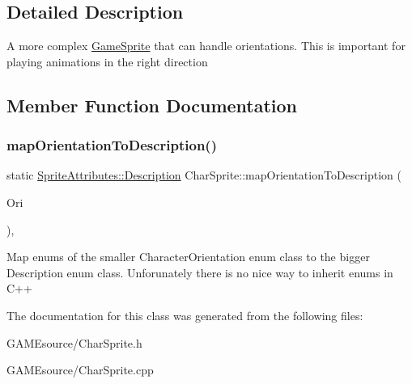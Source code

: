 \subsection{Detailed Description}
A more complex \mbox{\hyperlink{class_game_sprite}{Game\+Sprite}} that can handle orientations. This is important for playing animations in the right direction 

\subsection{Member Function Documentation}
\mbox{\label{class_char_sprite_a7556b4b4123dbd51b13ec46fc11c0810}} 
\subsubsection{\texorpdfstring{map\+Orientation\+To\+Description()}{mapOrientationToDescription()}}
{\footnotesize\ttfamily static \mbox{\hyperlink{namespace_sprite_attributes_a3ece96d6288b14d53d84e2138392395c}{Sprite\+Attributes\+::\+Description}} Char\+Sprite\+::map\+Orientation\+To\+Description (\begin{DoxyParamCaption}\item[{Character\+Orientation}]{Ori }\end{DoxyParamCaption})\hspace{0.3cm}{\ttfamily [inline]}, {\ttfamily [static]}}

Map enums of the smaller Character\+Orientation enum class to the bigger Description enum class. Unforunately there is no nice way to inherit enums in C++ 

The documentation for this class was generated from the following files\+:\begin{DoxyCompactItemize}
\item 
G\+A\+M\+Esource/Char\+Sprite.\+h\item 
G\+A\+M\+Esource/Char\+Sprite.\+cpp\end{DoxyCompactItemize}
